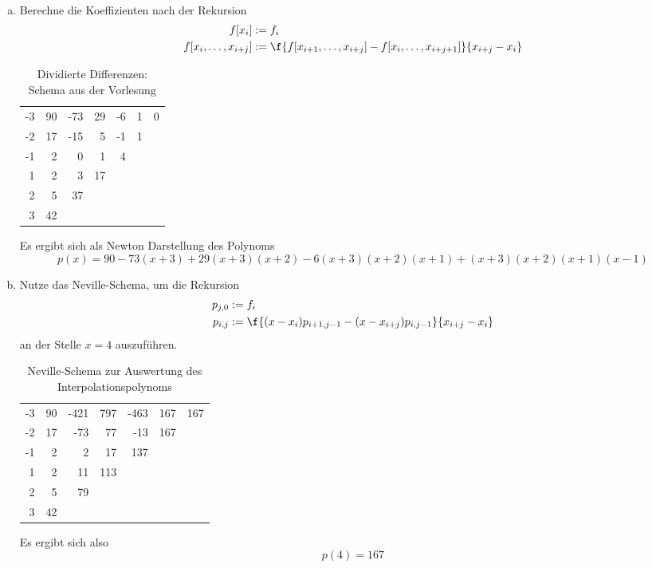 \documentclass{mywork}
\begin{document}
\begin{aufgabe}~

	\begin{enumerate}[a)]
		\item 
			Berechne die Koeffizienten nach der Rekursion
			\begin{align*}
				f[x_i] &:= f_i\\
				f[x_i,\dotsc,x_{i+j}] &:= \f {f[x_{i+1},\dotsc,x_{i+j}]-f[x_i,\dotsc,x_{i+j+1}]}{x_{i+j}-x_i}
			\end{align*}

			\begin{table}[h]
				\centering
				\caption{Dividierte Differenzen: Schema aus der Vorlesung}
				\begin{tabular}{r|rrrrrr}
					-3 & 90 & -73 & 29 & -6 & 1 & 0 \\
					-2 & 17 & -15 & 5 & -1 & 1 & \\
					-1 & 2 & 0 & 1 & 4 & & \\
					 1 & 2 & 3 & 17 & & & \\
					 2 & 5 & 37 & & & & \\
					 3 & 42 & & & & &
				\end{tabular}
			\end{table}
			Es ergibt sich als Newton Darstellung des Polynoms
			\[
				p(x) = 90 - 73(x+3) + 29(x+3)(x+2) - 6(x+3)(x+2)(x+1) + (x+3)(x+2)(x+1)(x-1)
			\]
		\item
			Nutze das Neville-Schema, um die Rekursion
			\begin{align*}
				p_{j,0} &:= f_i \\
				p_{i,j} &:= \f {(x-x_i)p_{i+1,j-1}-(x-x_{i+j})p_{i,j-1}}{x_{i+j}-x_i}
			\end{align*}
			an der Stelle $x=4$ auszuführen.

			\begin{table}[h]
				\centering
				\caption{Neville-Schema zur Auswertung des Interpolationspolynoms}
				\begin{tabular}{r|rrrrrr}
					-3 & 90 & -421 & 797 & -463 & 167 & 167 \\
					-2 & 17 & -73 & 77 & -13 & 167 & \\
					-1 & 2 & 2 & 17 & 137 & & \\
					 1 & 2 & 11 & 113 & & & \\
					 2 & 5 & 79 & & & & \\
					 3 & 42 & & & & &
				\end{tabular}
			\end{table}
			Es ergibt sich also
			\[
				p(4) = 167
			\]
	\end{enumerate}
\end{aufgabe}
\newpage
\end{document}
